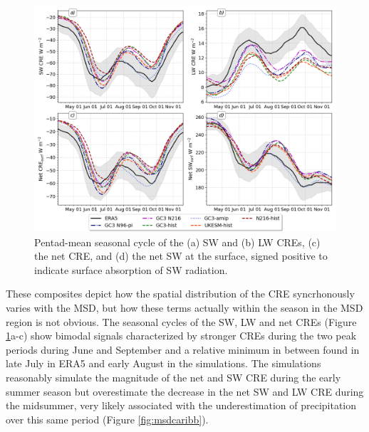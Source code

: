 \begin{figure}[t!]
\includegraphics[width=\linewidth]{figures/cre_index_seasonal.png}
\caption[Seasonal cycle of cloud-radiative effects]{Pentad-mean seasonal cycle of the (a) SW and (b)  LW CREs, (c) the net CRE, and (d) the net SW at the surface, signed positive to indicate surface absorption of SW radiation.}
\label{fig:cre_seasonal}
\end{figure}

These composites depict how the spatial distribution of the CRE syncrhonously varies with the MSD, but how these terms actually within the season in the MSD region is not obvious. The seasonal cycles of the SW, LW and net CREs (Figure \ref{fig:cre_seasonal}a-c) show bimodal signals characterized by stronger CREs during the two peak periods during June and September and a relative minimum in between found in late July in ERA5 and early August in the simulations. The simulations reasonably simulate the magnitude of the net and SW CRE during the early summer season but overestimate the decrease in the net SW and LW CRE during the midsummer, very likely associated with the underestimation of precipitation over this same period (Figure \ref{fig:msdcaribb}).

